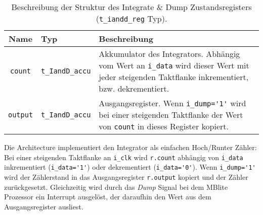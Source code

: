 \begin{table}[htbp]
    \ttabbox
    {
        \caption[Typdefinition Code NCO Zustandsregister]{Beschreibung der Struktur des Integrate \& Dump Zustandsregisters (\lstinline$t_iandd_reg$ Typ).}
        \label{Tab_t_iandd_reg_Type}
    }
    {
    \begin{tabular}{c  p{2cm} p{6cm}}
        \toprule
        Name				& Typ						& Beschreibung \\
        \midrule
        \lstinline$count$		& \lstinline$t_IandD_accu$	&  Akkumulator des Integrators. Abhängig vom Wert an \lstinline$i_data$ wird dieser Wert mit jeder steigenden Taktflanke inkrementiert, bzw. dekrementiert.\\
        \lstinline$output$		& \lstinline$t_IandD_accu$	&  Ausgangsregister. Wenn \lstinline$i_dump='1'$ wird bei einer steigenden Taktflanke der Wert von \lstinline$count$ in dieses Register kopiert. \\
        \bottomrule
    \end{tabular}
}
\end{table}

Die Architecture implementiert den Integrator als einfachen Hoch/Runter Zähler: Bei einer steigenden Taktflanke an \lstinline$i_clk$ wird \lstinline$r.count$ abhängig von \lstinline$i_data$ inkrementiert (\lstinline$i_data='1'$) oder dekrementiert (\lstinline$i_data='0'$). Wenn \lstinline$i_dump='1'$ wird der Zählerstand in das Ausgangsregister \lstinline$r.output$ kopiert und der Zähler zurückgesetzt. Gleichzeitig wird durch das \emph{Dump} Signal bei dem MBlite Prozessor ein Interrupt ausgelöst, der daraufhin den Wert aus dem Ausgangsregister ausliest.
